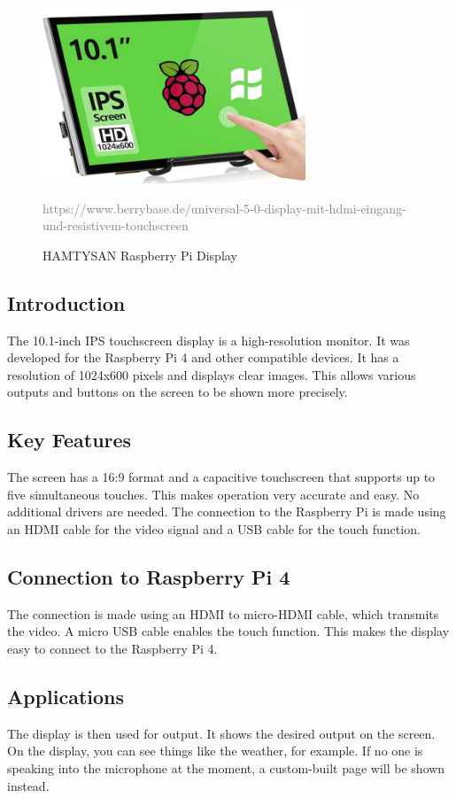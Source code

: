 \begin{figure}[h]
\centering
\includegraphics[width=0.7\textwidth]{assets/Bildschirm(1)}
\caption{HAMTYSAN Raspberry Pi Display}
\textcolor{gray}{https://www.berrybase.de/universal-5-0-display-mit-hdmi-eingang-und-resistivem-touchscreen}
\end{figure}

\subsection*{Introduction}
The 10.1-inch IPS touchscreen display is a high-resolution monitor. It was developed for the Raspberry Pi 4 and other compatible devices. It has a resolution of 1024x600 pixels and displays clear images. This allows various outputs and buttons on the screen to be shown more precisely.

\subsection*{Key Features}
The screen has a 16:9 format and a capacitive touchscreen that supports up to five simultaneous touches. This makes operation very accurate and easy. No additional drivers are needed. The connection to the Raspberry Pi is made using an HDMI cable for the video signal and a USB cable for the touch function.

\subsection*{Connection to Raspberry Pi 4}
The connection is made using an HDMI to micro-HDMI cable, which transmits the video. A micro USB cable enables the touch function. This makes the display easy to connect to the Raspberry Pi 4.

\subsection*{Applications}
The display is then used for output. It shows the desired output on the screen. On the display, you can see things like the weather, for example. If no one is speaking into the microphone at the moment, a custom-built page will be shown instead.

